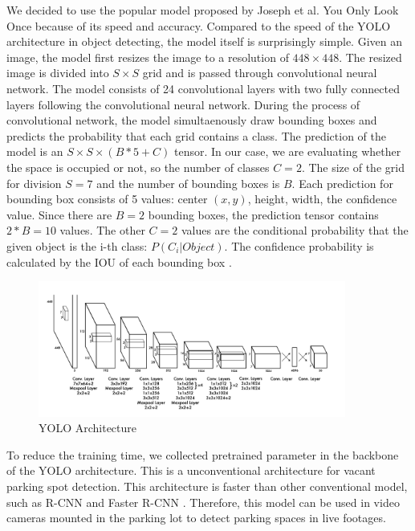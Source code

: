 \documentclass{article}
\begin{document}
We decided to use the popular model proposed by Joseph et al. \cite{redmon2016look} You Only Look Once because of its speed and accuracy. Compared to the speed of the YOLO architecture in object detecting, the model itself is surprisingly simple. Given an image, 
the model first resizes the image to a resolution of $448 \times 448$. The resized image is divided into $S \times S$ 
grid and is passed through convolutional neural network. The model consists of 24 convolutional layers with two fully connected layers following the convolutional neural network. During the process of convolutional network, the model simultaenously
draw bounding boxes and predicts the probability that each grid contains a class. The prediction of the model is an $S \times S \times (B * 5+C)$ tensor. In our case, we are evaluating whether the space is occupied or not, so the number of classes 
$C = 2$. The size of the grid for division $S = 7$ and the number of bounding boxes is  $B$. Each prediction for bounding box consists of 5 values: center $(x,y)$, height, width, the confidence value. Since there are $B=2$ bounding boxes, the prediction 
tensor contains $2 * B = 10$ values. The other $C=2$ values are the conditional probability that the given object is the i-th class: $P(C_i | Object)$. The confidence probability is calculated by the IOU of each bounding box \cite{redmon2016look}. 

\begin{figure}[ht]
    \centering
    \includegraphics[width=0.9\textwidth]{figs/Screenshot 2024-03-22 at 21.55.19.png}
    \caption{YOLO Architecture}
\end{figure}

To reduce the training time, we collected pretrained parameter in the backbone of the YOLO architecture. This is a unconventional architecture for vacant parking spot detection. This architecture is faster than other conventional model, such as R-CNN and Faster R-CNN \cite{redmon2016look}. 
Therefore, this model can be used in video cameras mounted in the parking lot to detect parking spaces in live footages. 
\end{document}
